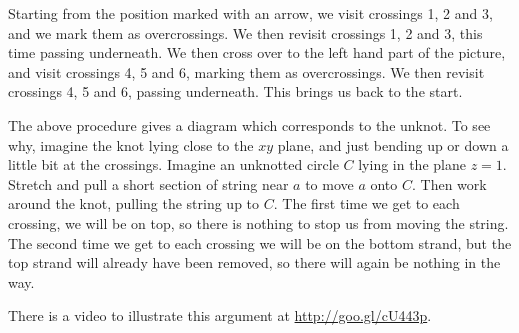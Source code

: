 \documentclass[a4paper]{amsart}
\begin{document}
\begin{solution}
\begin{center}
 \end{center}
 Starting from the position marked with an arrow, we visit crossings
 1, 2 and 3, and we mark them as overcrossings.  We then revisit
 crossings 1, 2 and 3, this time passing underneath.  We then cross
 over to the left hand part of the picture, and visit crossings 4, 5
 and 6, marking them as overcrossings.  We then revisit crossings 4, 5
 and 6, passing underneath.  This brings us back to the start.

 The above procedure gives a diagram which corresponds to the unknot.
 To see why, imagine the knot lying close to the $xy$ plane, and just
 bending up or down a little bit at the crossings.  Imagine an
 unknotted circle $C$ lying in the plane $z=1$.  Stretch and pull a
 short section of string near $a$ to move $a$ onto $C$.  Then work
 around the knot, pulling the string up to $C$.  The first time we get
 to each crossing, we will be on top, so there is nothing to stop us
 from moving the string.  The second time we get to each crossing we
 will be on the bottom strand, but the top strand will already have
 been removed, so there will again be nothing in the way.

 There is a video to illustrate this argument at \url{http://goo.gl/cU443p}.
\end{solution}
\end{document}
